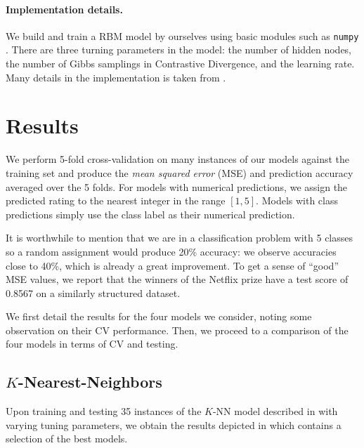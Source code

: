 \documentclass[bj, preprint]{imsart}
\begin{document}
\paragraph{Implementation details.}\label{par:method.models.rbm.impl}

We build and train a RBM model by ourselves using basic modules such as \texttt{numpy} \citep{numpy2011}. There are three turning parameters in the model: the number of hidden nodes, the number of Gibbs samplings in Contrastive Divergence, and the learning rate. Many details in the implementation is taken from \cite{hinton2012practical}.


\section{Results}\label{sec:results}

We perform 5-fold cross-validation on many instances of our models against the training set and produce the \textit{mean squared error} (MSE) and prediction accuracy averaged over the 5 folds. For models with numerical predictions, we assign the predicted rating to the nearest integer in the range $[1,5]$.  Models with class predictions simply use the class label as their numerical prediction. 

It is worthwhile to mention that we are in a classification problem with 5 classes so a random assignment would produce 20\% accuracy: we observe accuracies close to 40\%, which is already a great improvement. To get a sense of ``good'' MSE values, we report that the winners of the Netflix prize \citep{bennett2007netflix} have a test score of \num{0.8567} on a similarly structured dataset.

We first detail the results for the four models we consider, noting some observation on their CV performance. Then, we proceed to a comparison of the four models in terms of CV and testing.

\subsection{$K$-Nearest-Neighbors}\label{sebsec:results.knn}

Upon training and testing 35 instances of the $K$-NN model described in  with varying tuning parameters, we obtain the results depicted in  which contains a selection of the best models.
\end{document}
